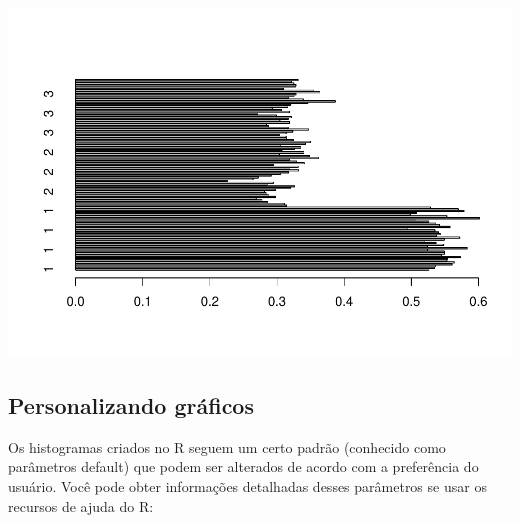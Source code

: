 \documentclass[
]{book}
\newenvironment{Shaded}{\begin{snugshade}}{\end{snugshade}}
\newcommand{\KeywordTok}[1]{\textcolor[rgb]{0.13,0.29,0.53}{\textbf{#1}}}
\newcommand{\NormalTok}[1]{#1}
\newcommand{\OperatorTok}[1]{\textcolor[rgb]{0.81,0.36,0.00}{\textbf{#1}}}
\begin{document}
\begin{Shaded}
\end{Shaded}

\includegraphics{TudodoR_files/figure-latex/unnamed-chunk-169-1.pdf}

\hypertarget{personalizando-gruxe1ficos}{%
\subsection{Personalizando gráficos}\label{personalizando-gruxe1ficos}}

Os histogramas criados no R seguem um certo padrão (conhecido como parâmetros
default) que podem ser alterados de acordo com a preferência do usuário. Você pode obter informações detalhadas desses parâmetros se usar os recursos de ajuda do R:
\end{document}
